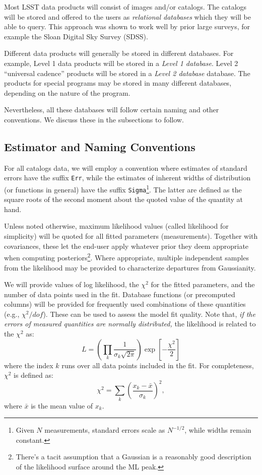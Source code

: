 \documentclass[SE,lsstdraft,toc]{lsstdoc}
\newcommand{\marginreq}[1]{\marginpar{\hspace{0pt}\tiny #1}}
\newcommand{\dmreq}[1]{\marginreq{DMS-REQ-#1}}
\begin{document}
Most LSST data products will consist of images and/or catalogs. The catalogs will be stored and offered to the users as \emph{relational databases} which they will be able to query. This approach was shown to work well by prior large surveys, for example the Sloan Digital Sky Survey (SDSS).

Different data products will generally be stored in different databases. For example, Level 1 data products will be stored in a \emph{Level 1 database}. Level 2 ``universal cadence'' products will be stored in a \emph{Level 2 database} database. The products for special programs may be stored in many different databases, depending on the nature of the program.

Nevertheless, all these databases will follow certain naming and other conventions. We discuss these in the subsections to follow.



\subsection{Estimator and Naming Conventions}

For all catalogs data, we will employ a convention where estimates of standard errors have the suffix \texttt{Err}, while the estimates of inherent widths of distribution (or functions in general) have the suffix \texttt{Sigma}\footnote{Given $N$ measurements, standard errors scale as $N^{-1/2}$, while widths remain constant.}. The latter are defined as the square roots of the second moment about the quoted value of the quantity at hand.

\dmreq{0333}
Unless noted otherwise, maximum likelihood values (called likelihood for simplicity) will be quoted for all fitted parameters (measurements). Together with covariances, these let the end-user apply whatever prior they deem appropriate when computing posteriors\footnote{There's a tacit assumption that a Gaussian is a reasonably good description of the likelihood surface around the ML peak.}. Where appropriate, multiple independent samples from the likelihood may be provided to characterize departures from Gaussianity.

We will provide values of log likelihood, the $\chi^2$ for the fitted parameters, and the number of data points used in the fit. \dmreq{0331}Database functions (or precomputed columns) will be provided for frequently used combinations of these quantities (e.g., $\chi^2/dof$). These can be used to assess the model fit quality. Note that, \textit{if the errors of measured quantities are normally distributed,} the likelihood is related to the $\chi^2$ as:
%
\begin{equation}
    L = \left(\prod_{k}\frac{1}{\sigma_k \sqrt{2 \pi}}\right) \exp \left[- \frac{\chi^2}{2}\right]
\end{equation}
%
where the index $k$ runs over all data points included in the fit.
For completeness, $\chi^2$ is defined as:
%
\begin{equation}
      \chi^2 = \sum_{k} \left( \frac{x_k-\bar{x}}{\sigma_k}\right)^2,
\end{equation}
%
where $\bar{x}$ is the mean value of $x_k$.
\end{document}

